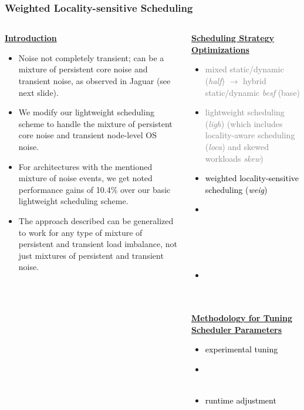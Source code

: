 \begin{frame}
\frametitle{Weighted Locality-sensitive Scheduling}
\begin{columns}[T]
  \begin{column}{0.5\textwidth}
    {\small \underline{\textbf{Introduction}}} \\
    \begin{itemize}
      \tiny \item \tiny Noise not completely transient; 
      can be a mixture of persistent core noise and transient noise, as observed
      in Jaguar (see next slide). 
    \item \tiny We modify our lightweight scheduling scheme to handle the
      mixture of persistent core noise and transient node-level OS noise. 
    \item \tiny For architectures with 
      the mentioned mixture of noise events, we get noted performance
      gains of 10.4\% over our basic lightweight scheduling scheme. 
    \item \tiny The approach described can be generalized to work for any
      type of mixture of persistent and transient load imbalance, not just
      mixtures of persistent and transient noise. 
    \end{itemize}
  \end{column}
  \begin{column}{0.5\textwidth}
    {\tiny  \underline{\textbf{Scheduling Strategy Optimizations}}}\\
    \begin{itemize}
      \tiny \item \tiny \textcolor{gray}{ mixed static/dynamic (\textit{half}) $\rightarrow$ hybrid static/dynamic \textit{besf} (base)}   
    \item \tiny \textcolor{gray}{ lightweight scheduling (\textit{ligh}) (which includes locality-aware scheduling (\textit{loca}) and skewed workloads \textit{skew})}
    \item \tiny \textcolor{black} {weighted locality-sensitive scheduling (\textit{weig})}
    \item \tiny \textcolor{white} {slack-conscious scheduling: \textit{slac} :  model-guided\textit{Static-Hybrid},   slack-conscious(\textit{callsite\_fd})}
    \item \tiny \textcolor{white} {staggered hybrid static/dynamic scheduling: \textit{ssds}}
    \end{itemize}
        {\tiny \underline{\textbf {Methodology for Tuning Scheduler Parameters}}}
        \begin{itemize}
          \tiny \item \tiny \textcolor{black} {experimental tuning}
        \item \tiny \textcolor{white} {model-guided optimization} %
        \item \tiny \textcolor{black} {runtime adjustment} %
        \end{itemize}
  \end{column}
\end{columns}
\end{frame} 

